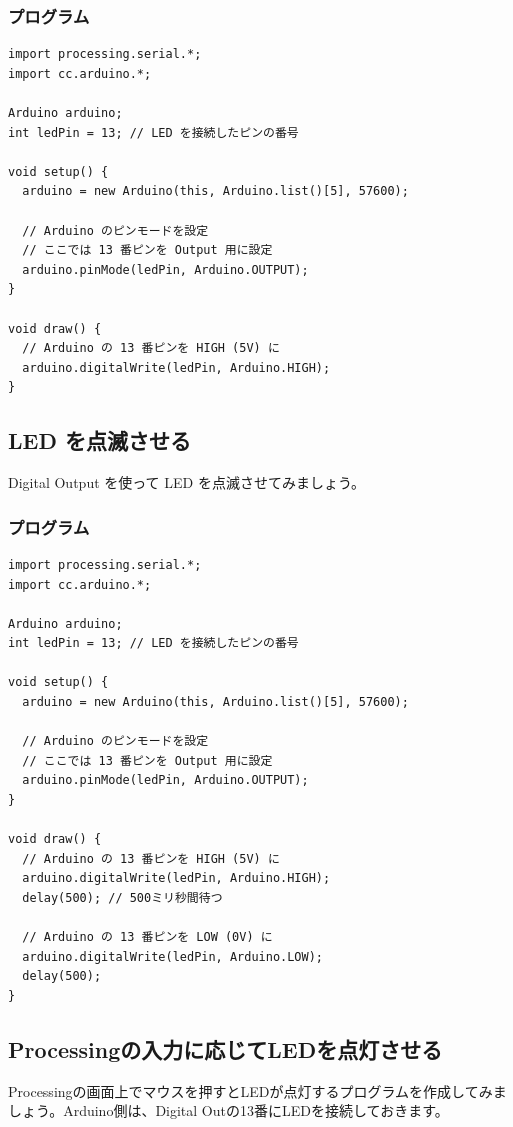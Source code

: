 \documentclass[11pt,a4paper]{jarticle}
\begin{document}
\subsubsection*{プログラム}
\begin{lstlisting}
import processing.serial.*;
import cc.arduino.*;
 
Arduino arduino;
int ledPin = 13; // LED を接続したピンの番号
 
void setup() {
  arduino = new Arduino(this, Arduino.list()[5], 57600);

  // Arduino のピンモードを設定
  // ここでは 13 番ピンを Output 用に設定
  arduino.pinMode(ledPin, Arduino.OUTPUT);
}
 
void draw() {
  // Arduino の 13 番ピンを HIGH (5V) に
  arduino.digitalWrite(ledPin, Arduino.HIGH);
}
\end{lstlisting}

\subsection{LED を点滅させる}
Digital Output を使って LED を点滅させてみましょう。

\subsubsection*{プログラム}
\begin{lstlisting}
import processing.serial.*;
import cc.arduino.*;
 
Arduino arduino;
int ledPin = 13; // LED を接続したピンの番号
 
void setup() {
  arduino = new Arduino(this, Arduino.list()[5], 57600);

  // Arduino のピンモードを設定
  // ここでは 13 番ピンを Output 用に設定
  arduino.pinMode(ledPin, Arduino.OUTPUT);
}
 
void draw() {
  // Arduino の 13 番ピンを HIGH (5V) に
  arduino.digitalWrite(ledPin, Arduino.HIGH);
  delay(500); // 500ミリ秒間待つ

  // Arduino の 13 番ピンを LOW (0V) に
  arduino.digitalWrite(ledPin, Arduino.LOW);
  delay(500);
}
\end{lstlisting}

\subsection{Processingの入力に応じてLEDを点灯させる}
Processingの画面上でマウスを押すとLEDが点灯するプログラムを作成してみましょう。Arduino側は、Digital Outの13番にLEDを接続しておきます。
\end{document}
